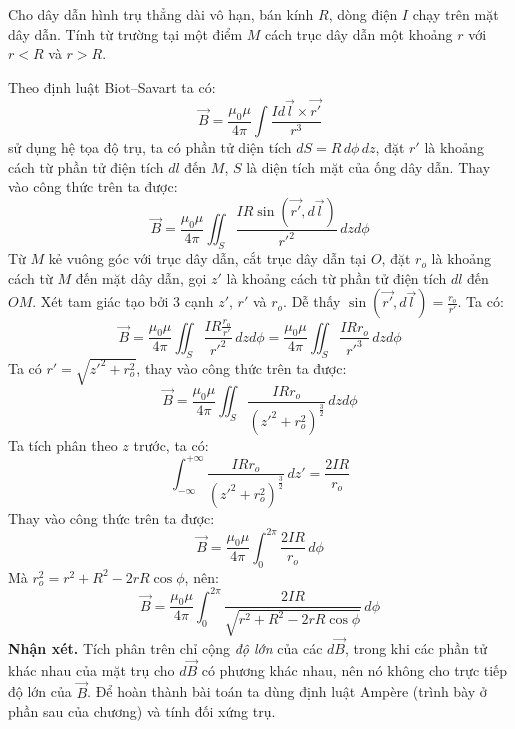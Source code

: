 \begin{problem}
Cho dây dẫn hình trụ thẳng dài vô hạn, bán kính $R$, dòng điện $I$ chạy trên mặt dây dẫn. Tính từ trường tại một điểm $M$ cách trục dây dẫn một khoảng $r$ với $r < R$ và $r > R$.
\end{problem}
\begin{sol}
Theo định luật Biot--Savart ta có:
\[\vec{B} = \frac{\mu_0 \mu}{4\pi}\int \frac{I d\vec{l} \times \vec{r'}}{r^3}\]
sử dụng hệ tọa độ trụ, ta có phần tử diện tích $dS = R\,d\phi\,dz$, đặt $r'$ là khoảng cách từ phần tử điện tích $dl$ đến $M$, $S$ là diện tích mặt của ống dây dẫn. Thay vào công thức trên ta được:
\[
\vec{B} = \frac{\mu_0 \mu}{4\pi} \iint_S \frac{IR \sin(\vec{r'}, d\vec{l})}{r'^2} \, dzd\phi
\]
Từ $M$ kẻ vuông góc với trục dây dẫn, cắt trục dây dẫn tại $O$, đặt $r_{o}$ là khoảng cách từ $M$ đến mặt dây dẫn, gọi $z'$ là khoảng cách từ phần tử điện tích $dl$ đến $OM$. Xét tam giác tạo bởi 3 cạnh $z'$, $r'$ và $r_{o}$. Dễ thấy $\sin(\vec{r'}, d\vec{l}) = \frac{r_{o}}{r'}$. Ta có:
\[\vec{B} = \frac{\mu_0 \mu}{4\pi}\iint_S \frac{IR \frac{r_{o}}{r'}}{r'^{2}} \, dzd\phi = \frac{\mu_0 \mu}{4\pi}\iint_S \frac{IR r_{o}}{r'^{3}} \,dzd\phi\]
Ta có $r' = \sqrt{z'^2 + r_{o}^2}$, thay vào công thức trên ta được:
\[\vec{B} = \frac{\mu_0 \mu}{4\pi}\iint_S \frac{IR r_{o}}{(z'^2 + r_{o}^2)^{\frac{3}{2}}} \, dzd\phi\]
Ta tích phân theo $z$ trước, ta có:
\[\int_{-\infty}^{+\infty} \frac{IR r_{o}}{(z'^2 + r_{o}^2)^{\frac{3}{2}}} \, dz' = \frac{2IR}{r_{o}}\]
Thay vào công thức trên ta được:
\[\vec{B} = \frac{\mu_0 \mu}{4\pi}\int_0^{2\pi} \frac{2IR}{r_{o}} \, d\phi\]
Mà $r_{o}^2 = r^2 + R^2 -2 rR\cos\phi$, nên:
\[\vec{B} = \frac{\mu_0 \mu}{4\pi}\int_0^{2\pi} \frac{2IR}{\sqrt{r^2 + R^2 - 2 rR\cos\phi}} \, d\phi\]
\textbf{Nhận xét.} Tích phân trên chỉ cộng \textit{độ lớn} của các $d\vec{B}$, trong khi các phần tử khác nhau của mặt trụ cho $d\vec{B}$ có phương khác nhau, nên nó không cho trực tiếp độ lớn của $\vec{B}$. Để hoàn thành bài toán ta dùng định luật Ampère (trình bày ở phần sau của chương) và tính đối xứng trụ.


\end{sol}
